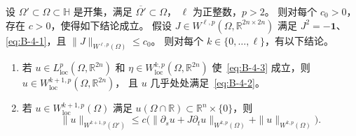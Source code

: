 \begin{proposition}\label{prop:B-4-9}
设 $\Omega'\subset\Omega\subset\mathbb H$ 是开集，满足
$\overline{\Omega'}\subset\Omega$，
$\ell$ 为正整数，$p>2$。
则对每个 $c_0>0$，存在 $c>0$，使得如下结论成立。
假设 $J\in W^{\ell,p}(\Omega,\mathbb R^{2n\times2n})$ 满足
$J^2=-\mathbf 1$、\eqref{eq:B-4-1}，且
$\|J\|_{W^{\ell,p}(\Omega)}\le c_0$。
则对每个 $k\in\{0,\ldots,\ell\}$，有以下结论。
\begin{enumerate}[label=\textup{(\roman*)}]
\item 若 $u\in L^p_{\mathrm{loc}}(\Omega,\mathbb R^{2n})$ 和
$\eta\in W^{k,p}_{\mathrm{loc}}(\Omega,\mathbb R^{2n})$
使~\eqref{eq:B-4-3} 成立，则
$u\in W^{k+1,p}_{\mathrm{loc}}(\Omega,\mathbb R^{2n})$，
且 $u$ 几乎处处满足~\eqref{eq:B-4-2}。
\item 若 $u\in W^{k+1,p}_{\mathrm{loc}}(\Omega)$ 满足
$u(\Omega\cap\mathbb R)\subset\mathbb R^n\times\{0\}$，则
\[
  \|u\|_{W^{k+1,p}(\Omega')}
  \le c\bigl(\|\partial_su+J\partial_tu\|_{W^{k,p}(\Omega)}
          +\|u\|_{W^{k,p}(\Omega)}\bigr).
\]
\end{enumerate}
\end{proposition}

